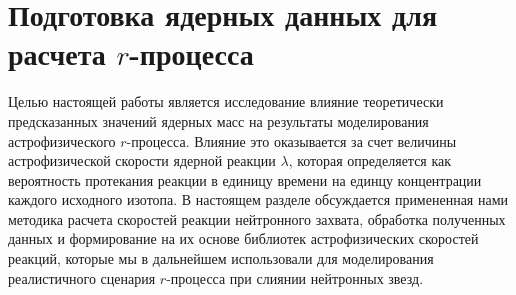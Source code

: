 \section{Подготовка ядерных данных для расчета $r$-процесса} 
Целью настоящей работы является исследование влияние теоретически предсказанных значений ядерных масс на результаты моделирования астрофизического $r$-процесса. Влияние это оказывается за счет величины астрофизической скорости ядерной реакции $\lambda$, которая определяется как вероятность протекания реакции в единицу времени на единцу концентрации каждого исходного изотопа. В настоящем разделе обсуждается примененная нами методика расчета скоростей реакции нейтронного захвата, обработка полученных данных и формирование на их основе библиотек астрофизических скоростей реакций, которые мы в дальнейшем использовали для моделирования реалистичного сценария $r$-процесса при слиянии нейтронных звезд.
